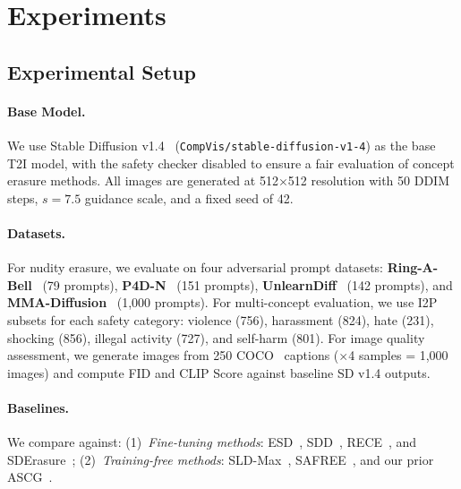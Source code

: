 \section{Experiments}
\label{sec:exp}

\subsection{Experimental Setup}

\paragraph{Base Model.} We use Stable Diffusion v1.4~\citep{rombach2022high} (\texttt{CompVis/stable-diffusion-v1-4}) as the base T2I model, with the safety checker disabled to ensure a fair evaluation of concept erasure methods. All images are generated at 512$\times$512 resolution with 50 DDIM steps, $s=7.5$ guidance scale, and a fixed seed of 42.

\paragraph{Datasets.} For nudity erasure, we evaluate on four adversarial prompt datasets: \textbf{Ring-A-Bell}~\citep{tsai2024ring} (79 prompts), \textbf{P4D-N}~\citep{chin2024prompting4debugging} (151 prompts), \textbf{UnlearnDiff}~\citep{zhang2024generate} (142 prompts), and \textbf{MMA-Diffusion}~\citep{yang2024mma} (1,000 prompts). For multi-concept evaluation, we use I2P~\citep{schramowski2023safe} subsets for each safety category: violence (756), harassment (824), hate (231), shocking (856), illegal activity (727), and self-harm (801). For image quality assessment, we generate images from 250 COCO~\citep{lin2014microsoft} captions ($\times$4 samples = 1,000 images) and compute FID and CLIP Score against baseline SD v1.4 outputs.

\paragraph{Baselines.} We compare against: (1)~\emph{Fine-tuning methods}: ESD~\citep{gandikota2023erasing}, SDD~\citep{kim2023towards}, RECE~\citep{gong2024reliable}, and SDErasure~\citep{lu2026sderasure}; (2)~\emph{Training-free methods}: SLD-Max~\citep{schramowski2023safe}, SAFREE~\citep{yoon2024safree}, and our prior ASCG~\citep{gil2026ascg}.

